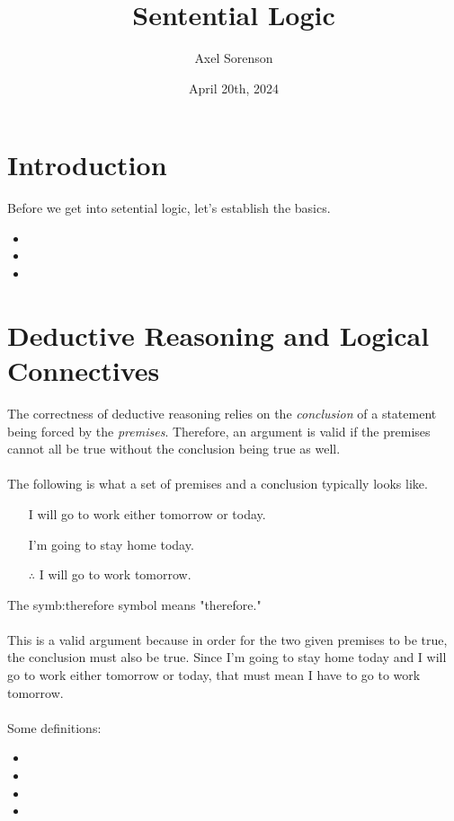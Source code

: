 \documentclass{article}
\title{Sentential Logic}
\author{Axel Sorenson}
\date{April 20th, 2024}
\begin{document}
\maketitle

\section{Introduction}
Before we get into setential logic, let's establish the basics.\\
\begin{itemize}
	\item {}
	\item {}
	\item {}
\end{itemize}

\section{Deductive Reasoning and Logical Connectives}
The correctness of deductive reasoning relies on the \textit{conclusion} of a statement being forced by the \textit{premises}. Therefore, an argument is valid if the premises cannot all be true without the conclusion being true as well.\\\\
\noindent
The following is what a set of premises and a conclusion typically looks like.\\

\begin{itemize}
    \item[] I will go to work either tomorrow or today.
    \item[] I'm going to stay home today.
    \item[$\therefore$] I will go to work tomorrow.
\end{itemize}

\noindent The \gls{symb:therefore} symbol means "therefore."\\\\
\noindent
This is a valid argument because in order for the two given premises to be true, the conclusion must also be true. Since I'm going to stay home today and I will go to work either tomorrow or today, that must mean I have to go to work tomorrow.\\\\
\noindent
Some definitions:
\begin{itemize}
	\item {}
	\item {}
	\item {}
	\item {}
\end{itemize}
\end{document}
